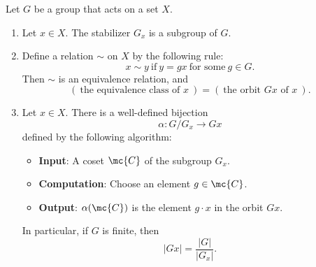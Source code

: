 \documentclass[math1530-lecture-notes]{subfiles}
\begin{document}
\begin{proposition}{}
  Let $G$ be a group that acts on a set $X$.
  \begin{enumerate}
    \item Let $x\in X$. The stabilizer $G_x$ is a subgroup of $G$.
    \item Define a relation $\sim$ on $X$ by the following rule: \[
        x\sim y ~\text{if}~ y=gx ~\text{for some}~g\in G
      .\] Then $\sim$ is an equivalence relation, and \[
        (~\text{the equivalence class of $x$}~)=(~\text{the orbit $Gx$ of $x$}~)
      .\] 
    \item Let $x\in X$. There is a well-defined bijection \[
      \alpha:G / G_x \longrightarrow Gx
    \] defined by the following algorithm:
    \begin{itemize}
      \item \textbf{Input}: A coset $\mc{C}$ of the subgroup $G_x$.
      \item \textbf{Computation}: Choose an element $g\in \mc{C}$.
      \item \textbf{Output}: $\alpha(\mc{C})$ is the element $g\cdot x$ in the orbit $Gx$.
    \end{itemize}
    In particular, if $G$ is finite, then \[
      \left| Gx \right| = \frac{\left| G \right| }{\left| G_x \right| }
    .\] 
  \end{enumerate}
\end{proposition}
\end{document}
